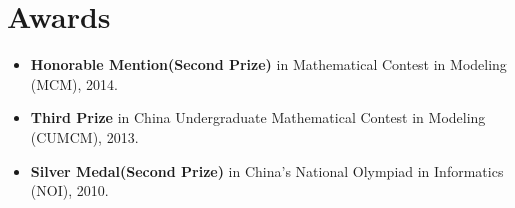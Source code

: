 \documentclass[letterpaper]{article}
\begin{document}
\section*{Awards}
\begin{itemize}
\item  \textbf{Honorable Mention(Second Prize)} in Mathematical Contest in Modeling (MCM), 2014.
\item  \textbf{Third Prize} in China Undergraduate Mathematical Contest in Modeling (CUMCM), 2013. 
\item  \textbf{Silver Medal(Second Prize)} in China's National Olympiad in Informatics (NOI), 2010. 
\end{itemize}
\end{document}

